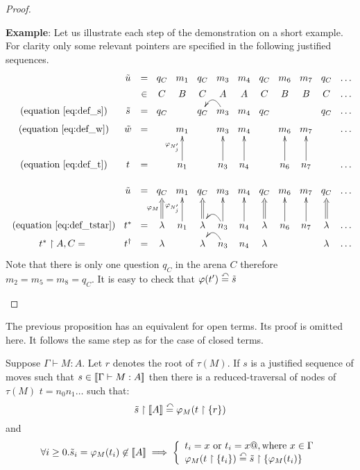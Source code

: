 \begin{proof}
\begin{itemize}
    \textbf{Example}: Let us illustrate each step of the demonstration on a short example.
        For clarity only some relevant pointers are specified in the following justified sequences.
    $$
    \xymatrix @=3pt{
        & \tilde{u} &=& q_C & m_1 & q_C & m_3 & m_4 & q_C & m_6 & m_7 & q_C & \ldots \\
        & &\in& C & B & C & A & A & C & B & B & C & \ldots \\
        \mbox{ (equation \ref{eq:def_s})} & \tilde{s} &=& q_C & & q_C & m_3  \ar@/_1pc/[l] & m_4 & q_C &  & & q_C & \ldots \\
        \mbox{ (equation \ref{eq:def_w})} & \tilde{w}  &=&  & m_1 &  & m_3 & m_4 &  & m_6 & m_7 &  & \ldots  \\ \\ \\
        \mbox{ (equation \ref{eq:def_t})} & t &=&  & n_1\ar[uuu]^{\varphi_{N'_j}} &  & n_3 \ar[uuu] & n_4\ar[uuu] & & n_6\ar[uuu] & n_7\ar[uuu] &  & \ldots \\ \\
        & \tilde{u}  &=& q_C & m_1 & q_C & m_3 & m_4 & q_C & m_6 & m_7 & q_C & \ldots  \\ \\ \\
        \mbox{ (equation \ref{eq:def_tstar})} & t^\ast &=& \lambda \ar@{=>}[uuu]^{\varphi_{M}} & n_1\ar[uuu]^{\varphi_{N'_j}} & \lambda\ar@{=>}[uuu] & n_3 \ar[uuu] \ar@/_1pc/[l] & n_4\ar[uuu] & \lambda\ar@{=>}[uuu] & n_6\ar[uuu] & n_7\ar[uuu] & \lambda\ar@{=>}[uuu] & \ldots \\
        t^\ast\upharpoonright A,C =& t^\dagger &=& \lambda &  & \lambda & n_3\ar@/_1pc/[l] & n_4 & \lambda & &  & \lambda & \ldots \\
        }
    $$
    Note that there is only one question $q_C$ in the arena $C$ therefore $m_2 = m_5 = m_8 = q_C$.
    It is easy to check that $\varphi(t') \stackrel{\curvearrowleft}{=} \tilde{s}$
\end{itemize}
\end{proof}

The previous proposition has an equivalent for open terms. Its proof is omitted here. It
follows the same step as for the case of closed terms.
\begin{prop}
\label{prop:rel_gamesem_redtrav_opened}
Suppose $\Gamma \vdash M : A$. Let $r$ denotes the root of $\tau(M)$. If $s$ is a justified sequence of moves such
that $s \in {[\![\Gamma \vdash M:A ]\!]}$ then there is a reduced-traversal of nodes of $\tau(M)$
$t = n_0 n_1 \ldots$ such that:
 $$\tilde{s} \upharpoonright {[\![A ]\!]} \stackrel{\curvearrowleft}{=}  \varphi_M (t \upharpoonright \{r \})$$
and
$$\forall i \geq 0 . \tilde{s}_i = \varphi_M(t_i) \not \in {[\![A ]\!]}
\implies \left\{
        \begin{array}{ll}
            t_i = x \mbox{ or } t_i = x@, \hbox{where } x \in \Gamma \\
            \varphi_M(t \upharpoonright \{t_i\}) \stackrel{\curvearrowleft}{=} \tilde{s} \upharpoonright \{ \varphi_M(t_i) \}
        \end{array}
        \right.
$$
\end{prop}

